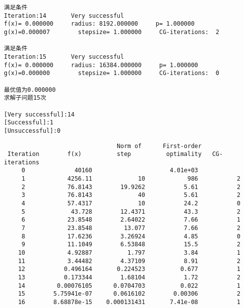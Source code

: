 \begin{lstlisting}
满足条件
Iteration:14	   Very successful
f(x)= 0.000000     radius: 8192.000000     p= 1.000000
g(x)=0.000007        stepsize= 1.000000     CG-iterations:  2 

满足条件
Iteration:15	   Very successful
f(x)= 0.000000     radius: 16384.000000     p= 1.000000
g(x)=0.000000        stepsize= 1.000000     CG-iterations:  0 

最优值为0.000000
求解子问题15次

[Very successful]:14
[Successful]:1
[Unsuccessful]:0
\end{lstlisting}

\begin{lstlisting}
                                Norm of      First-order 
 Iteration        f(x)          step          optimality   CG-iterations
     0              40160                      4.01e+03                
     1            4256.11             10            986           2
     2            76.8143        19.9262           5.61           2
     3            76.8143             40           5.61           2
     4            57.4317             10           24.2           0
     5             43.728        12.4371           43.3           2
     6            23.8548        2.64022           7.66           1
     7            23.8548         13.077           7.66           2
     8            17.6236        3.26924           4.85           0
     9            11.1049        6.53848           15.5           2
    10            4.92887          1.797           3.84           1
    11            3.44482        4.37109           8.91           2
    12           0.496164       0.224523          0.677           1
    13           0.173344        1.68104           1.72           2
    14         0.00076105      0.0704703          0.022           1
    15        5.75941e-07      0.0616102        0.00306           2
    16        8.68878e-15    0.000131431       7.41e-08           1
\end{lstlisting}
